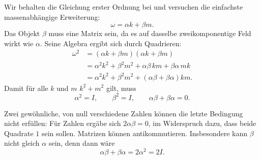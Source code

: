 Wir behalten die Gleichung erster Ordnung bei und versuchen die einfachste massenabhängige Erweiterung:
\begin{equation}
\omega=\alpha k+\beta m.
\end{equation}
Das Objekt \(\beta\) muss eine Matrix sein, da es auf dasselbe zweikomponentige Feld wirkt wie \(\alpha\). Seine Algebra ergibt sich durch Quadrieren:
\begin{align}
\omega^2
&=(\alpha k+\beta m)(\alpha k+\beta m)\\
&=\alpha^2k^2+\beta^2m^2
+\alpha\beta\,km+\beta\alpha\,mk\\
&=\alpha^2k^2+\beta^2m^2
+(\alpha\beta+\beta\alpha)km.
\end{align}
Damit für alle \(k\) und \(m\) \(k^2+m^2\) gilt, muss
\begin{equation}
\alpha^2=I,
\qquad
\beta^2=I,
\qquad
\alpha\beta+\beta\alpha=0.
\end{equation}

Zwei gewöhnliche, von null verschiedene Zahlen können die letzte Bedingung nicht erfüllen: Für Zahlen ergäbe sich \(2\alpha\beta=0\), im Widerspruch dazu, dass beide Quadrate \(1\) sein sollen. Matrizen können antikommutieren. Insbesondere kann \(\beta\) nicht gleich \(\alpha\) sein, denn dann wäre
\begin{equation}
\alpha\beta+\beta\alpha=2\alpha^2=2I.
\end{equation}

